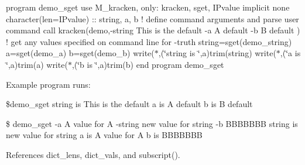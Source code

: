 program demo\+\_\+sget use M\+\_\+kracken, only\+: kracken, sget, I\+Pvalue implicit none character(len=I\+Pvalue) \+:\+: string, a, b ! define command arguments and parse user command call kracken(\textquotesingle{}demo\textquotesingle{},\textquotesingle{}-\/string This is the default -\/a A default -\/b B default\textquotesingle{} ) ! get any values specified on command line for -\/truth string=sget(\textquotesingle{}demo\+\_\+string\textquotesingle{}) a=sget(\textquotesingle{}demo\+\_\+a\textquotesingle{}) b=sget(\textquotesingle{}demo\+\_\+b\textquotesingle{}) write($\ast$,\textquotesingle{}(\char`\"{}string is \char`\"{},a\textquotesingle{})trim(string) write($\ast$,\textquotesingle{}(\char`\"{}a is \char`\"{},a\textquotesingle{})trim(a) write($\ast$,\textquotesingle{}(\char`\"{}b is \char`\"{},a\textquotesingle{})trim(b) end program demo\+\_\+sget

Example program runs\+:

\$demo\+\_\+sget string is This is the default a is A default b is B default

\$ demo\+\_\+sget -\/a A value for A -\/string new value for string -\/b B\+B\+B\+B\+B\+BB string is new value for string a is A value for A b is B\+B\+B\+B\+B\+BB 

References dict\+\_\+lens, dict\+\_\+vals, and subscript().

